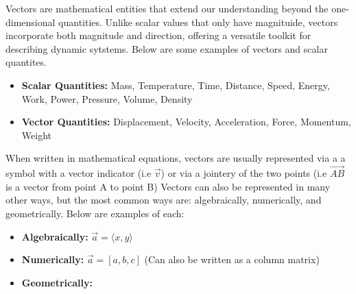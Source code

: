 \documentclass[12pt]{article}
\begin{document}
        \begin{flushleft}

            Vectors are mathematical entities that extend our understanding beyond the 
            one-dimensional quantities. Unlike scalar values that only have magnituide, 
            vectors incorporate both magnitude and direction, offering a versatile toolkit
            for describing dynamic sytstems. Below are some examples of vectors and scalar
            quantites.

            \begin{itemize}
                \item \textbf{Scalar Quantities:} Mass, Temperature, Time, Distance, Speed, 
                Energy, Work, Power, Pressure, Volume, Density
                \item \textbf{Vector Quantities:} Displacement, Velocity, Acceleration, 
                Force, Momentum, Weight
            \end{itemize}

            When written in mathematical equations, vectors are usually represented via a a symbol with a vector indicator (i.e $\vec{v}$)
            or via a jointery of the two points (i.e $\vec{AB}$ is a vector from point A to point B) Vectors 
            can also be represented in many other ways, but the most common ways are: algebraically, numerically, 
            and geometrically. Below are examples of each:

            \begin{itemize}

                \item \textbf{Algebraically:} $\vec{a} = \langle x, y \rangle$
                \item  \textbf{Numerically:} $\vec{a} = \left[ a, b, c \right]$ (Can also be written as a column matrix)

                \item { \textbf{Geometrically:} 

                    \begin{center}

                        \begin{tikzpicture}
                        

\end{tikzpicture}
\end{center}}
\end{itemize}
\end{flushleft}
\end{document}
